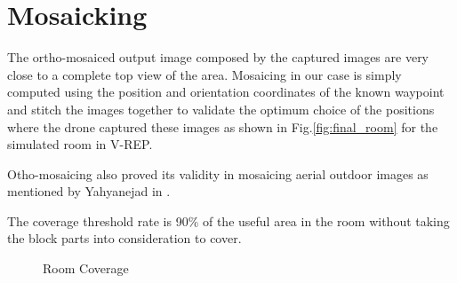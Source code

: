  
\section{Mosaicking}
The ortho-mosaiced output image composed by the captured
images are very close to a complete top view of the area.
Mosaicing in our case is simply computed using the position and orientation coordinates of the known waypoint and stitch the images together to validate the optimum choice of the positions where the drone captured these images as shown in Fig.\ref{fig:final_room} for the simulated room in V-REP.

Otho-mosaicing also proved its validity in mosaicing aerial outdoor images as mentioned by Yahyanejad in  \cite{yahyanejad2010incremental}.

The coverage threshold rate is 90\% of the useful area in the room without taking the block parts into consideration to cover.
\hfill
\vfill

\begin{figure}[!tbp]
  \caption{Room Coverage}
\end{figure}

\hfill

